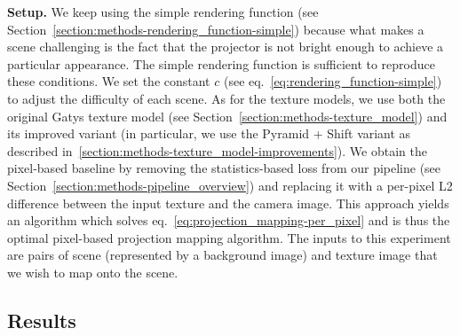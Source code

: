 \textbf{Setup.} We keep using the simple rendering function (see Section~\ref{section:methods-rendering_function-simple}) because what makes a scene challenging is the fact that the projector is not bright enough to achieve a particular appearance. The simple rendering function is sufficient to reproduce these conditions. We set the constant \(c\) (see eq.~\ref{eq:rendering_function-simple}) to adjust the difficulty of each scene. As for the texture models, we use both the original Gatys texture model (see Section~\ref{section:methods-texture_model}) and its improved variant (in particular, we use the Pyramid + Shift variant as described in~\ref{section:methods-texture_model-improvements}). We obtain the pixel-based baseline by removing the statistics-based loss from our pipeline (see Section~\ref{section:methods-pipeline_overview}) and replacing it with a per-pixel L2 difference between the input texture and the camera image. This approach yields an algorithm which solves eq.~\ref{eq:projection_mapping-per_pixel} and is thus the optimal pixel-based projection mapping algorithm. The inputs to this experiment are pairs of scene (represented by a background image) and texture image that we wish to map onto the scene.

\subsection{Results}
\label{section:results-experiments-02-results}

